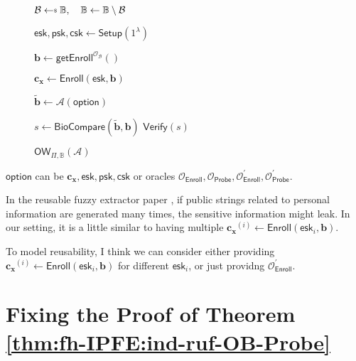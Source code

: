 \begin{figure}[h]
\centering

	\begin{minipage}[t]{0.55\textwidth}
	\begin{algorithm}[H]
	\caption{$\textsf{OW}_{\Pi, \mathbb{B}}(\mathcal{A})$}
	\label{alg:ow_game}
	\begin{algorithmic}[1]

		\State $\mathcal{B} \getsdollar \mathbb{B}, \quad \mathbb{B} \gets \mathbb{B} \setminus \mathcal{B}$

		\State $\textsf{esk}, \textsf{psk}, \textsf{csk} \gets \textsf{Setup}(1^\lambda)$

		\State $\mathbf{b} \gets \textsf{getEnroll}^{\mathcal{O}_{\mathcal{B}}}()$

		\State $\mathbf{c_x} \gets \textsf{Enroll}(\textsf{esk}, \mathbf{b})$

		\State $\mathbf{\tilde{b}} \gets \mathcal{A}( \textsf{option} )$

		\State $s \gets \textsf{BioCompare}( \mathbf{\tilde{b}}, \mathbf{b})$
		\State \Return $ \textsf{Verify}(s) $
	\end{algorithmic}
	\end{algorithm}
	\end{minipage}

\label{fig:ow_game}
\end{figure}

\noindent $\textsf{option}$ can be $\mathbf{c_x}, \textsf{esk}, \textsf{psk}, \textsf{csk}$ or oracles $\mathcal{O}_{\textsf{Enroll}}, \mathcal{O}_{\textsf{Probe}}, \mathcal{O}^\prime_{\textsf{Enroll}}, \mathcal{O}^\prime_{\textsf{Probe}}$.

In the reusable fuzzy extractor paper \cite{10.1145/1030083.1030096}, if public strings related to personal information are generated many times, the sensitive information might leak. In our setting, it is a little similar to having multiple $\mathbf{c_x}^{(i)} \gets \textsf{Enroll}(\textsf{esk}_i, \mathbf{b})$.

To model reusability, I think we can consider either providing $\mathbf{c_x}^{(i)} \gets \textsf{Enroll}(\textsf{esk}_i, \mathbf{b})$ for different $\textsf{esk}_i$, or just providng $\mathcal{O}^\prime_{\textsf{Enroll}}$.



\section{Fixing the Proof of Theorem \ref{thm:fh-IPFE:ind-ruf-OB-Probe}}

